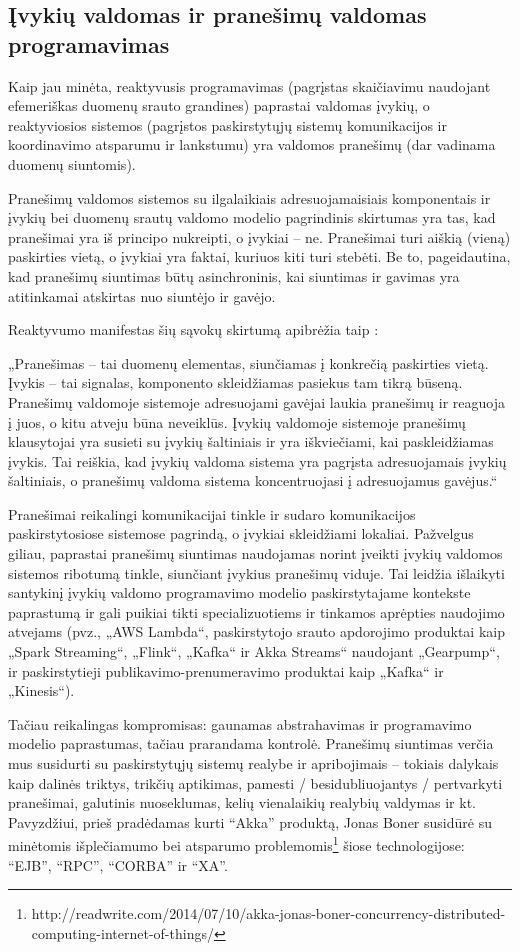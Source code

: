 \subsection{Įvykių valdomas ir pranešimų valdomas programavimas}

Kaip jau minėta, reaktyvusis programavimas (pagrįstas skaičiavimu naudojant efemeriškas duomenų srauto grandines) paprastai valdomas įvykių, o reaktyviosios sistemos (pagrįstos paskirstytųjų sistemų komunikacijos ir koordinavimo atsparumu ir lankstumu) yra valdomos pranešimų (dar vadinama duomenų siuntomis).

Pranešimų valdomos sistemos su ilgalaikiais adresuojamaisiais komponentais ir įvykių bei duomenų srautų valdomo modelio pagrindinis skirtumas yra tas, kad pranešimai yra iš principo nukreipti, o įvykiai – ne. Pranešimai turi aiškią (vieną) paskirties vietą, o įvykiai yra faktai, kuriuos kiti turi stebėti. Be to, pageidautina, kad pranešimų siuntimas būtų asinchroninis, kai siuntimas ir gavimas yra atitinkamai atskirtas nuo siuntėjo ir gavėjo.

Reaktyvumo manifestas šių sąvokų skirtumą apibrėžia taip \cite{ReactiveManifesto}:

„Pranešimas – tai duomenų elementas, siunčiamas į konkrečią paskirties vietą. Įvykis – tai signalas, komponento skleidžiamas pasiekus tam tikrą būseną. Pranešimų valdomoje sistemoje adresuojami gavėjai laukia pranešimų ir reaguoja į juos, o kitu atveju būna neveiklūs. Įvykių valdomoje sistemoje pranešimų klausytojai yra susieti su įvykių šaltiniais ir yra iškviečiami, kai paskleidžiamas įvykis. Tai reiškia, kad įvykių valdoma sistema yra pagrįsta adresuojamais įvykių šaltiniais, o pranešimų valdoma sistema koncentruojasi į adresuojamus gavėjus.“

Pranešimai reikalingi komunikacijai tinkle ir sudaro komunikacijos paskirstytosiose sistemose pagrindą, o įvykiai skleidžiami lokaliai. Pažvelgus giliau, paprastai pranešimų siuntimas naudojamas norint įveikti įvykių valdomos sistemos ribotumą tinkle, siunčiant įvykius pranešimų viduje. Tai leidžia išlaikyti santykinį įvykių valdomo programavimo modelio paskirstytajame kontekste paprastumą ir gali puikiai tikti specializuotiems ir tinkamos aprėpties naudojimo atvejams (pvz., „AWS Lambda“, paskirstytojo srauto apdorojimo produktai kaip „Spark Streaming“, „Flink“, „Kafka“ ir Akka Streams“ naudojant „Gearpump“, ir paskirstytieji publikavimo-prenumeravimo produktai kaip „Kafka“ ir „Kinesis“).

Tačiau reikalingas kompromisas: gaunamas abstrahavimas ir programavimo modelio paprastumas, tačiau prarandama kontrolė. Pranešimų siuntimas verčia mus susidurti su paskirstytųjų sistemų realybe ir apribojimais – tokiais dalykais kaip dalinės triktys, trikčių aptikimas, pamesti / besidubliuojantys / pertvarkyti pranešimai, galutinis nuoseklumas, kelių vienalaikių realybių valdymas ir kt. Pavyzdžiui, prieš pradėdamas kurti ``Akka'' produktą, Jonas Boner susidūrė su minėtomis išplečiamumo bei atsparumo problemomis\footnote{http://readwrite.com/2014/07/10/akka-jonas-boner-concurrency-distributed-computing-internet-of-things/} šiose technologijose: ``EJB'', ``RPC'', ``CORBA'' ir ``XA''.

